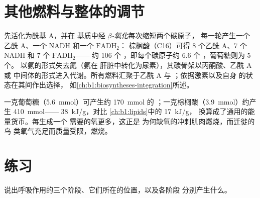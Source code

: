 \section{其他燃料与整体的调节}

\begin{proposition}[脂肪和蛋白质进入同一套代谢机制]\label{prop:b1:respiration-fermentation:otherfuels}
先活化为酰基 A，并在
基质中经 \emph{$\beta$-氧化}每次缩短两个碳原子，
每一轮产生一个乙酰 A、一个 NADH 和一个 $\mathrm{FADH_2}$：
棕榈酸（C16）可得 8 个乙酰 A、7 个 NADH 和 7 个 $\mathrm{FADH_2}$——
约 106 个 ，即每个碳原子约 \qty{6.6}{} 个 ，葡萄糖则为 5 个。
以氨的形式失去氮（氨在
肝脏中转化为尿素），其碳骨架以丙酮酸、乙酰 A 或
中间体的形式进入代谢。所有燃料汇聚于乙酰 A 与
；依据激素以及自身  的状态在其间作出选择，
如\cref{ch:b1:biosyntheses-integration}所述。
\end{proposition}

\begin{example}[各一克的对比]\label{ex:b1:respiration-fermentation:gramofeach}
一克葡萄糖（\qty{5.6}{mmol}）可产生约 \qty{170}{mmol} 的
；一克棕榈酸（\qty{3.9}{mmol}）约产生 \qty{410}{mmol}——
\qty{38}{kJ/g}，对比 \cref{ch:b1:lipids}中的 \qty{17}{kJ/g}，
换算成了通用的能量货币。每生成一个  需要的氧更多，这正是
为何缺氧的冲刺肌肉燃烧，而迁徙的鸟
类氧气充足而质量受限，燃烧。
\end{example}

\section{练习}

\begin{exercise}[$\star$]\label{exo:b1:respiration-fermentation:1}
说出呼吸作用的三个阶段、它们所在的位置，以及各阶段
分别产生什么。
\end{exercise}

